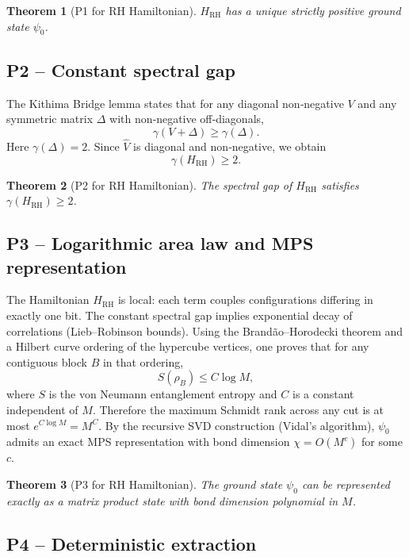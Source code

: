 \documentclass[11pt,a4paper]{article}
\newtheorem{theorem}{Theorem}[section]
\begin{document}
\begin{theorem}[P1 for RH Hamiltonian]
\(H_{\text{RH}}\) has a unique strictly positive ground state \(\psi_0\).
\end{theorem}

\subsection{P2 – Constant spectral gap}

The Kithima Bridge lemma states that for any diagonal non‑negative \(V\) and any symmetric matrix \(\Delta\) with non‑negative off‑diagonals,
\[
\gamma(V + \Delta) \ge \gamma(\Delta).
\]
Here \(\gamma(\Delta) = 2\). Since \(\hat{V}\) is diagonal and non‑negative, we obtain
\[
\gamma(H_{\text{RH}}) \ge 2.
\]

\begin{theorem}[P2 for RH Hamiltonian]
The spectral gap of \(H_{\text{RH}}\) satisfies \(\gamma(H_{\text{RH}}) \ge 2\).
\end{theorem}

\subsection{P3 – Logarithmic area law and MPS representation}

The Hamiltonian \(H_{\text{RH}}\) is local: each term couples configurations differing in exactly one bit. The constant spectral gap implies exponential decay of correlations (Lieb–Robinson bounds). Using the Brandão–Horodecki theorem and a Hilbert curve ordering of the hypercube vertices, one proves that for any contiguous block \(B\) in that ordering,
\[
S(\rho_B) \le C \log M,
\]
where \(S\) is the von Neumann entanglement entropy and \(C\) is a constant independent of \(M\). Therefore the maximum Schmidt rank across any cut is at most \(e^{C\log M} = M^{C}\). By the recursive SVD construction (Vidal's algorithm), \(\psi_0\) admits an exact MPS representation with bond dimension \(\chi = O(M^{c})\) for some \(c\).

\begin{theorem}[P3 for RH Hamiltonian]
The ground state \(\psi_0\) can be represented exactly as a matrix product state with bond dimension polynomial in \(M\).
\end{theorem}

\subsection{P4 – Deterministic extraction}
\end{document}
